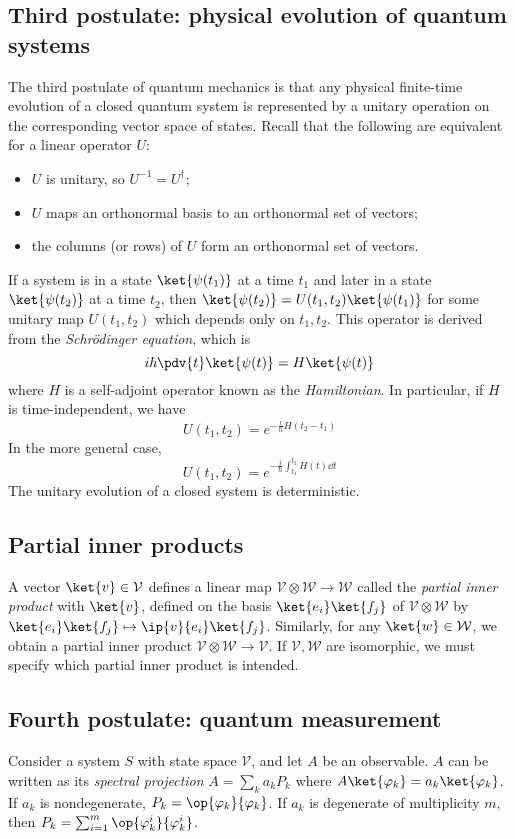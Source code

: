 \subsection{Third postulate: physical evolution of quantum systems}
The third postulate of quantum mechanics is that any physical finite-time evolution of a closed quantum system is represented by a unitary operation on the corresponding vector space of states.
Recall that the following are equivalent for a linear operator \( U \):
\begin{itemize}
    \item \( U \) is unitary, so \( U^{-1} = U^\dagger \);
    \item \( U \) maps an orthonormal basis to an orthonormal set of vectors;
    \item the columns (or rows) of \( U \) form an orthonormal set of vectors.
\end{itemize}
If a system is in a state \( \ket{\psi(t_1)} \) at a time \( t_1 \) and later in a state \( \ket{\psi(t_2)} \) at a time \( t_2 \), then \( \ket{\psi(t_2)} = U(t_1, t_2) \ket{\psi(t_1)} \) for some unitary map \( U(t_1, t_2) \) which depends only on \( t_1, t_2 \).
This operator is derived from the \emph{Schr\"odinger equation}, which is
\[ i\hbar \pdv{t} \ket{\psi(t)} = H \ket{\psi(t)} \]
where \( H \) is a self-adjoint operator known as the \emph{Hamiltonian}.
In particular, if \( H \) is time-independent, we have
\[ U(t_1, t_2) = e^{-\frac{i}{\hbar} H(t_2 - t_1)} \]
In the more general case,
\[ U(t_1, t_2) = e^{-\frac{i}{\hbar} \int_{t_1}^{t_2} H(t) \dd{t}} \]
The unitary evolution of a closed system is deterministic.

\subsection{Partial inner products}
A vector \( \ket{v} \in \mathcal V \) defines a linear map \( \mathcal V \otimes \mathcal W \to \mathcal W \) called the \emph{partial inner product} with \( \ket{v} \), defined on the basis \( \ket{e_i} \ket{f_j} \) of \( \mathcal V \otimes \mathcal W \) by \( \ket{e_i} \ket{f_j} \mapsto \ip{v}{e_i} \ket{f_j} \).
Similarly, for any \( \ket{w} \in \mathcal W \), we obtain a partial inner product \( \mathcal V \otimes \mathcal W \to \mathcal V \).
If \( \mathcal V, \mathcal W \) are isomorphic, we must specify which partial inner product is intended.

\subsection{Fourth postulate: quantum measurement}
Consider a system \( S \) with state space \( \mathcal V \), and let \( A \) be an observable.
\( A \) can be written as its \emph{spectral projection} \( A = \sum_k a_k P_k \) where \( A \ket{\varphi_k} = a_k \ket{\varphi_k} \).
If \( a_k \) is nondegenerate, \( P_k = \op{\varphi_k}{\varphi_k} \).
If \( a_k \) is degenerate of multiplicity \( m \), then \( P_k = \sum_{i=1}^m \op{\varphi_k^i}{\varphi_k^i} \).

